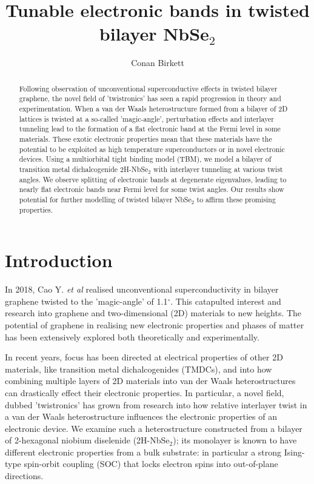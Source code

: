 \documentclass[12pt]{report} %
\title{\textbf{Tunable electronic bands in twisted bilayer NbSe$_2$}}
\author{Conan Birkett}
\affil{Department of Physics, University of Bath, Bath BA2 7AY, United Kingdom}
\begin{document}
\maketitle
\begin{abstract}
  Following observation of unconventional superconductive effects in twisted bilayer graphene, the novel field of 'twistronics' has seen a rapid progression in theory and experimentation. When a van der Waals heterostructure formed from a bilayer of 2D lattices is twisted at a so-called 'magic-angle', perturbation effects and interlayer tunneling lead to the formation of a flat electronic band at the Fermi level in some materials. These exotic electronic properties mean that these materials have the potential to be exploited as high temperature superconductors or in novel electronic devices. Using a multiorbital tight binding model (TBM), we model a bilayer of transition metal dichalcogenide 2H-NbSe$_2$ with interlayer tunneling at various twist angles. We observe splitting of electronic bands at degenerate eigenvalues, leading to nearly flat electronic bands near Fermi level for some twist angles. Our results show potential for further modelling of twisted bilayer NbSe$_2$ to affirm these promising properties.
\end{abstract}

\newpage

\section*{Introduction}

  In 2018, Cao Y. \textit{et al} \cite{Cao2018} realised unconventional superconductivity in bilayer graphene twisted to the 'magic-angle' of 1.1$^\circ$. This catapulted interest and research into graphene and two-dimensional (2D) materials to new heights. The potential of graphene in realising new electronic properties and phases of matter has been extensively explored both theoretically and experimentally.

  In recent years, focus has been directed at electrical properties of other 2D materials, like transition metal dichalcogenides (TMDCs), and into how combining multiple layers of 2D materials into van der Waals heterostructures can drastically effect their electronic properties. In particular, a novel field, dubbed 'twistronics' has grown from research into how relative interlayer twist in a van der Waals heterostructure influences the electronic properties of an electronic device. We examine such a heterostructure constructed from a bilayer of 2-hexagonal niobium diselenide (2H-NbSe$_2$); its monolayer is known to have different electronic properties from a bulk substrate: in particular a strong Ising-type spin-orbit coupling (SOC) that locks electron spins into out-of-plane directions.
\end{document}
